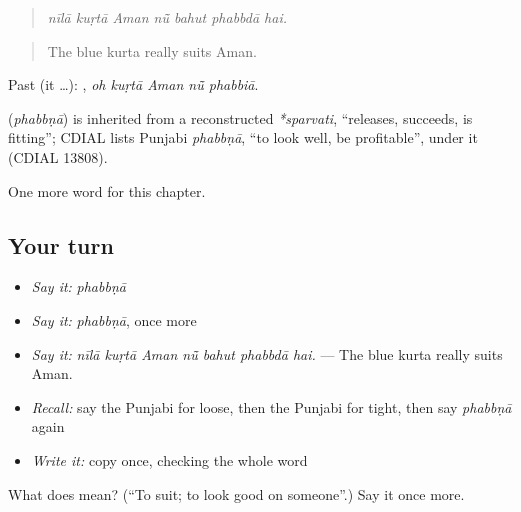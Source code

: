 \begin{quote}
      
\end{quote}

\begin{quote}
\emph{nīlā kuṛtā Aman nū̃ bahut phabbdā hai.}
\end{quote}

\begin{quote}
The blue kurta really suits Aman.
\end{quote}

Past (it …):     , \emph{oh kuṛtā Aman nū̃ phabbiā}.

\begin{cousinweb}
\textbf{} (\emph{phabbṇā}) is inherited from a reconstructed \emph{*sparvati}, \textquotedblleft{}releases, succeeds, is fitting\textquotedblright{}; CDIAL lists Punjabi \emph{phabbṇā}, \textquotedblleft{}to look well, be profitable\textquotedblright{}, under it (CDIAL 13808).
\end{cousinweb}

\begin{grammarlens}[title={What you've built}]
One more word for this chapter.
\end{grammarlens}

\subsection*{Your turn}
\begin{itemize}
\raggedright
  \item \emph{Say it:} \emph{phabbṇā}
  \item \emph{Say it:} \emph{phabbṇā}, once more
  \item \emph{Say it:} \emph{nīlā kuṛtā Aman nū̃ bahut phabbdā hai.} — The blue kurta really suits Aman.
  \item \emph{Recall:} say the Punjabi for loose, then the Punjabi for tight, then say \emph{phabbṇā} again
  \item \emph{Write it:} copy \textbf{} once, checking the whole word
\end{itemize}

\begin{tcolorbox}[breakable,colback=teal!4,colframe=teal!35!black,title={Before you move on}]
What does  mean? (\textquotedblleft{}To suit; to look good on someone\textquotedblright{}.) Say it once more.
\end{tcolorbox}
